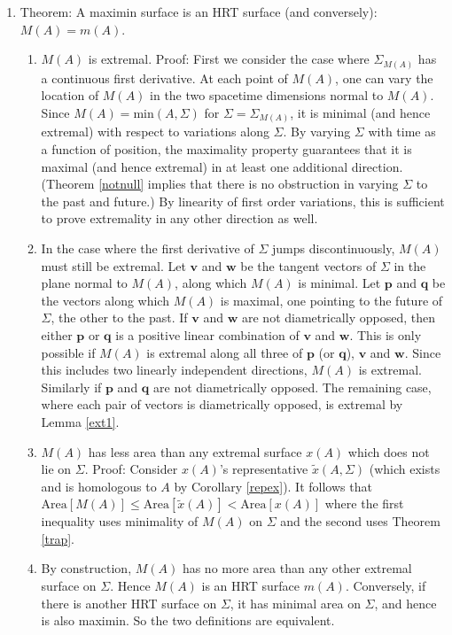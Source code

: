 \documentclass[12pt]{article}
\begin{document}
\begin{enumerate}[resume]
\item \label{Mism} Theorem: A maximin surface is an HRT surface (and conversely): $M(A) = m(A)$.
	\begin{enumerate}
	\item \label{ext1} $M(A)$ is extremal.  Proof: First we consider the case where $\Sigma_{M(A)}$ has a continuous first derivative.  At each point of $M(A)$, one can vary the location of $M(A)$ in the two spacetime dimensions normal to $M(A)$.  Since $M(A) = \mathrm{min}(A,\Sigma)$ for $\Sigma = \Sigma_{M(A)}$, it is minimal (and hence extremal) with respect to variations along $\Sigma$.  By varying $\Sigma$ with time as a function of position, the maximality property guarantees that it is maximal (and hence extremal) in at least one additional direction.  (Theorem \ref{notnull} implies that there is no obstruction in varying $\Sigma$ to the past and future.)  By linearity of first order variations, this is sufficient to prove extremality in any other direction as well.
	\item \label{ext2} In the case where the first derivative of $\Sigma$ jumps discontinuously, $M(A)$ must still be extremal.  Let $\mathbf{v}$ and $\mathbf{w}$ be the tangent vectors of $\Sigma$ in the plane normal to $M(A)$, along which $M(A)$ is minimal.  Let $\mathbf{p}$ and $\mathbf{q}$ be the vectors along which $M(A)$ is maximal, one pointing to the future of $\Sigma$, the other to the past.  If $\mathbf{v}$ and $\mathbf{w}$ are not diametrically opposed, then either $\mathbf{p}$ or $\mathbf{q}$ is a positive linear combination of $\mathbf{v}$ and $\mathbf{w}$.  This is only possible if $M(A)$ is extremal along all three of $\mathbf{p}$ (or $\mathbf{q}$), $\mathbf{v}$ and $\mathbf{w}$.  Since this includes two linearly independent directions, $M(A)$ is extremal.  Similarly if $\mathbf{p}$ and $\mathbf{q}$ are not diametrically opposed.  The remaining case, where each pair of vectors is diametrically opposed, is extremal by Lemma \ref{ext1}.
	\item \label{RT1} $M(A)$ has less area than any extremal surface $x(A)$ which does not lie on $\Sigma$.  Proof: Consider $x(A)$'s representative $\tilde{x}(A,\Sigma)$ (which exists and is homologous to $A$ by Corollary \ref{repex}).  It follows that $\mathrm{Area}[M(A)] \le \mathrm{Area}[\tilde{x}(A)] < \mathrm{Area}[x(A)]$ where the first inequality uses minimality of $M(A)$ on $\Sigma$ and the second uses Theorem \ref{trap}.
	\item \label{RT2} By construction, $M(A)$ has no more area than any other extremal surface on $\Sigma$.  Hence $M(A)$ is an HRT surface $m(A)$.  Conversely, if there is another HRT surface on $\Sigma$, it has minimal area on $\Sigma$, and hence is also maximin.  So the two definitions are equivalent.

\end{enumerate}
\end{enumerate}
\end{document}

